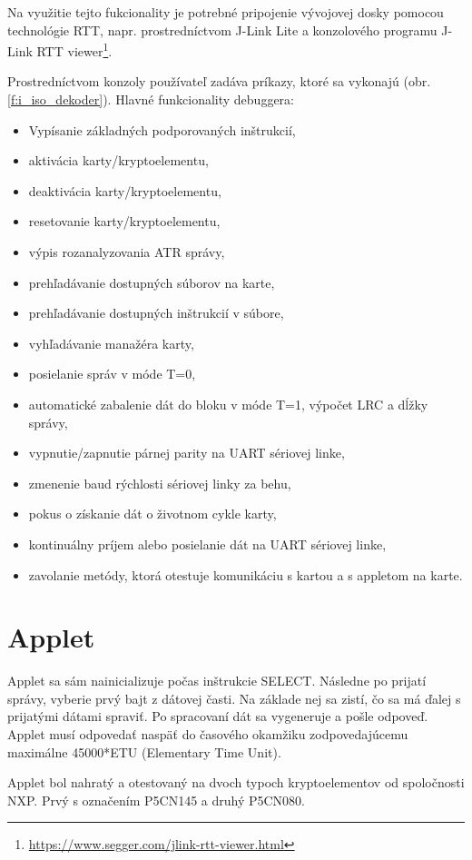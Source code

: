 \documentclass[12pt,a4wide,oneside,openright]{report}
\begin{document}
	Na využitie tejto fukcionality je potrebné pripojenie vývojovej dosky pomocou technológie RTT, napr. prostredníctvom J-Link Lite a konzolového programu J-Link RTT viewer\footnote{\url{https://www.segger.com/jlink-rtt-viewer.html}}.
	
	Prostredníctvom konzoly používateľ zadáva príkazy, ktoré sa vykonajú (obr. \ref{f:i_iso_dekoder}).
	Hlavné funkcionality debuggera:
	\singlespacing
	\begin{itemize}
		\item Vypísanie základných podporovaných inštrukcií,
		\item aktivácia karty/kryptoelementu,
		\item deaktivácia karty/kryptoelementu,
		\item resetovanie karty/kryptoelementu,
		\item výpis rozanalyzovania ATR správy,
		\item prehľadávanie dostupných súborov na karte,
		\item prehľadávanie dostupných inštrukcií v súbore,
		\item vyhľadávanie manažéra karty,		
		\item posielanie správ v móde T=0,
		\item automatické zabalenie dát do bloku v móde T=1, výpočet LRC a dĺžky správy,
		\item vypnutie/zapnutie párnej parity na UART sériovej linke,
		\item zmenenie baud rýchlosti sériovej linky za behu,
		\item pokus o získanie dát o životnom cykle karty,
		\item kontinuálny príjem alebo posielanie dát na UART sériovej linke,
		\item zavolanie metódy, ktorá otestuje komunikáciu s kartou a s appletom na karte.
	\end{itemize}
		\onehalfspacing

\section{Applet}
	Applet sa sám nainicializuje počas inštrukcie SELECT. Následne po prijatí správy, vyberie prvý bajt z dátovej časti. Na základe nej sa zistí, čo sa má ďalej s prijatými dátami spraviť. Po spracovaní dát sa vygeneruje a pošle odpoveď. Applet musí odpovedať naspäť do časového okamžiku zodpovedajúcemu maximálne 45000*ETU (Elementary Time Unit).
	
	Applet bol nahratý a otestovaný na dvoch typoch kryptoelementov od spoločnosti NXP. Prvý s označením P5CN145 a druhý P5CN080.
	
\end{document}
